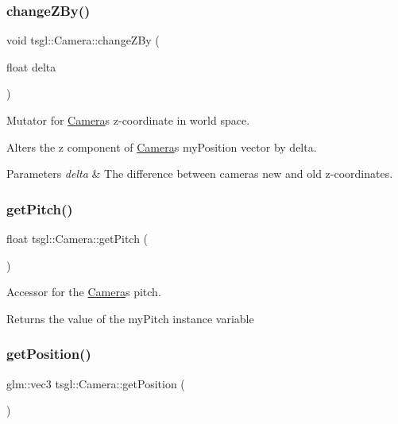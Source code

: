 \subsubsection{\texorpdfstring{change\+Z\+By()}{changeZBy()}}
{\footnotesize\ttfamily void tsgl\+::\+Camera\+::change\+Z\+By (\begin{DoxyParamCaption}\item[{float}]{delta }\end{DoxyParamCaption})}



Mutator for \hyperlink{classtsgl_1_1_camera}{Camera}\textquotesingle{}s z-\/coordinate in world space. 

Alters the z component of \hyperlink{classtsgl_1_1_camera}{Camera}\textquotesingle{}s my\+Position vector by delta. 
\begin{DoxyParams}{Parameters}
{\em delta} & The difference between camera\textquotesingle{}s new and old z-\/coordinates. \\
\hline
\end{DoxyParams}
\mbox{\label{classtsgl_1_1_camera_a73756ae570553923c70a084c11f1d225}} 
\subsubsection{\texorpdfstring{get\+Pitch()}{getPitch()}}
{\footnotesize\ttfamily float tsgl\+::\+Camera\+::get\+Pitch (\begin{DoxyParamCaption}{ }\end{DoxyParamCaption})}



Accessor for the \hyperlink{classtsgl_1_1_camera}{Camera}\textquotesingle{}s pitch. 

Returns the value of the my\+Pitch instance variable \mbox{\label{classtsgl_1_1_camera_a21d2c903c077e9a746cd150e2e2bc697}} 
\subsubsection{\texorpdfstring{get\+Position()}{getPosition()}}
{\footnotesize\ttfamily glm\+::vec3 tsgl\+::\+Camera\+::get\+Position (\begin{DoxyParamCaption}{ }\end{DoxyParamCaption})}



